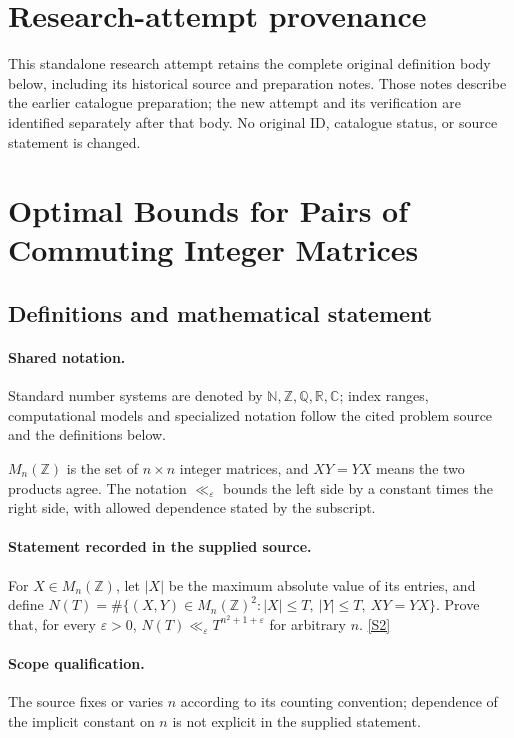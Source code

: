 \documentclass[11pt]{article}
\begin{document}
\section*{Research-attempt provenance}
This standalone research attempt retains the complete original definition body below,
including its historical source and preparation notes. Those notes describe the
earlier catalogue preparation; the new attempt and its verification are identified
separately after that body. No original ID, catalogue status, or source statement is changed.

\section{Optimal Bounds for Pairs of Commuting Integer Matrices}\label{statement}

\subsection{Definitions and mathematical statement}

\paragraph{Shared notation.}Standard number systems are denoted by $\mathbb N,\mathbb Z,\mathbb Q,\mathbb R,\mathbb C$; index ranges, computational models and specialized notation follow the cited problem source and the definitions below.


$M_n(\mathbb Z)$ is the set of $n\times n$ integer matrices, and $XY=YX$ means the two products agree. The notation $\ll_\varepsilon$ bounds the left side by a constant times the right side, with allowed dependence stated by the subscript.
\paragraph{Statement recorded in the supplied source.}
For $X\in M_n(\mathbb{Z})$, let $|X|$ be the maximum absolute value of its entries, and define $N(T)=\#\{(X,Y)\in M_n(\mathbb{Z})^2:|X|\leq T,\ |Y|\leq T,\ XY=YX\}$. Prove that, for every $\varepsilon>0$, $N(T)\ll_\varepsilon T^{n^2+1+\varepsilon}$ for arbitrary $n$. \href{https://doi.org/10.4171/owr/2025/52}{[S2]}
\paragraph{Scope qualification.}
The source fixes or varies $n$ according to its counting convention; dependence of the implicit constant on $n$ is not explicit in the supplied statement.
\end{document}
